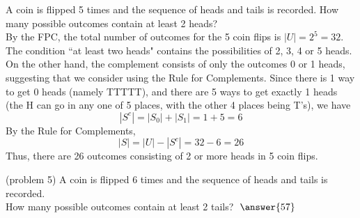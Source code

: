 \documentclass[handout]{ximera}
\begin{document}
\begin{example}[example 5]
A coin is flipped 5 times and the sequence of heads and tails is recorded.  
How many possible outcomes contain at least 2 heads?\\
By the FPC, the total number of outcomes for the 5 coin flips is $|U| = 2^5 = 32$. 
The condition ``at least two heads" contains the possibilities of 2, 3, 4 or 5 heads.  
On the other hand, the complement consists of only the outcomes 0 or 1 heads, suggesting that we consider 
using the Rule for Complements. Since there is 1 way to get 0 heads (namely TTTTT), and there are 5 ways to get exactly 1 heads (the H can go in any one of 5 places, with the other 4 places being T's), we have
\[
|S^c| = |S_0| + |S_1| = 1 + 5 = 6
\]
By the Rule for Complements, 
\[
|S| = |U| - |S^c| = 32 -6 = 26
\]
Thus, there are 26 outcomes consisting of 2 or more heads in 5 coin flips.
\end{example}

\begin{problem}(problem 5)
A coin is flipped 6 times and the sequence of heads and tails is recorded.\\
How many possible outcomes contain at least 2 tails? $\; \answer{57}$
\end{problem}
\end{document}

